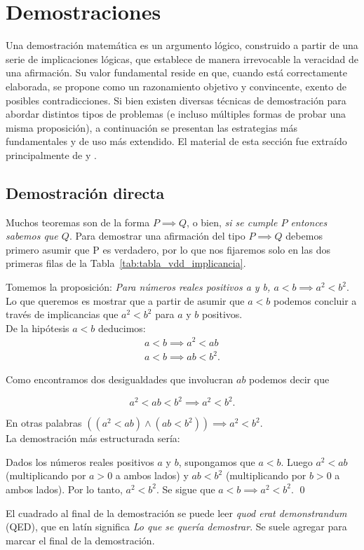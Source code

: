\documentclass[12pt]{book}
\begin{document}
\section{Demostraciones}
\noindent
Una demostración matemática es un argumento lógico, construido a partir de una serie de implicaciones lógicas, que establece de manera irrevocable la veracidad de una afirmación. Su valor fundamental reside en que, cuando está correctamente elaborada, se propone como un razonamiento objetivo y convincente, exento de posibles contradicciones. Si bien existen diversas técnicas de demostración para abordar distintos tipos de problemas (e incluso múltiples formas de probar una misma proposición), a continuación se presentan las estrategias más fundamentales y de uso más extendido. El material de esta sección fue extraído principalmente de \cite[Part I, Chapter 3]{eccles2013introduction} y \cite[Part I, Chapter 4]{eccles2013introduction}.

\subsection{Demostración directa}
\noindent
Muchos teoremas son de la forma $P\implies Q$, o bien, \textit{si se cumple $P$ entonces sabemos que $Q$}. Para demostrar una afirmación del tipo $P\implies Q$ debemos primero asumir que P es verdadero, por lo que nos fijaremos solo en las dos primeras filas de la Tabla~\ref{tab:tabla_vdd_implicancia}.\\

\begin{exampleenv}
Tomemos la proposición: \textit{Para números reales positivos a y b, $a<b\implies a^2<b^2$}. Lo que queremos es mostrar que a partir de asumir que $a<b$ podemos concluir a través de implicancias que $a^2<b^2$ para $a$ y $b$ positivos.\\

De la hipótesis $a<b$ deducimos: 
\begin{align*}
    a<b\implies a^2<ab\\
    a<b\implies ab<b^2.
\end{align*}

Como encontramos dos desigualdades que involucran $ab$ podemos decir que

    $$a^2<ab<b^2\implies a^2<b^2.$$

En otras palabras $((a^2<ab)\wedge(ab<b^2))\implies a^2<b^2$.\\

La demostración más estructurada sería: 

Dados los números reales positivos $a$ y $b$, supongamos que $a<b$. Luego $a^2<ab$ (multiplicando por $a>0$ a ambos lados) y $ab<b^2$ (multiplicando por $b>0$ a ambos lados). Por lo tanto, $a^2<b^2$. Se sigue que $a<b\implies a^2<b^2$. \qed \\
\end{exampleenv}
\noindent
El cuadrado al final de la demostración se puede leer \textit{quod erat demonstrandum} (QED), que en latín significa \textit{Lo que se quería demostrar}. Se suele agregar para marcar el final de la demostración.
\end{document}
